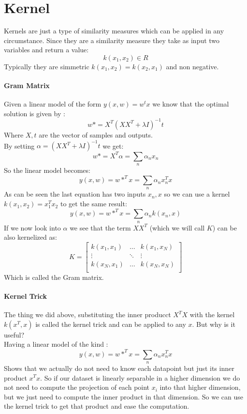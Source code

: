 \section{Kernel}
Kernels are just a type of similarity measures which can be applied in any circumstance. Since they are a similarity measure they take as input two variables and return a value:
$$k(x_1,x_2)\in R$$
Typically they are simmetric $k(x_1,x_2)=k(x_2,x_1)$ and non negative.

\paragraph{Gram Matrix}
Given a  linear model of the form $y(x,w)=w^tx$ we know that the optimal solution is given by :
$$w*=X^T(XX^T+\lambda I)^{-1}t$$
Where $X,t$ are the vector of samples and outputs.\\
By setting $\alpha=(XX^T+\lambda I)^{-1}t$ we get:
$$w*=X^T\alpha=\sum_n\alpha_nx_n$$
So the linear model becomes:
$$y(x,w)=w*^Tx=\sum_n\alpha_nx^T_nx$$
As can be seen the last equation has two inputs $x_n,x$ so we can use a kernel $k(x_1,x_2)=x_1^Tx_2$ to get the same result:
$$y(x,w)=w*^Tx=\sum_n\alpha_n k(x_n,x)$$
If we now look into $\alpha$ we see that the term $XX^T$ (which we will  call $K$) can be also kernelized as:
$$K=
\begin{bmatrix}
k(x_1,x_1) & \dots & k(x_1,x_N)\\
\vdots & \ddots & \vdots\\
k(x_N,x_1) & \dots & k(x_N,x_N)\\
\end{bmatrix}
$$
Which is called the Gram matrix.

\paragraph{Kernel Trick}
The thing we did above, substituting the inner producct $X^TX$ with the kernel $k(x^T,x)$ is called the kernel trick and can be applied to any $x$. But why is it useful?\\
Having a linear model of the kind :
$$y(x,w)=w*^Tx=\sum_n\alpha_nx^T_nx$$
Shows that we actually do not need to know each datapoint but just its inner product $x^Tx$. So if our dataset is linearly separable in a higher dimension we do not need to compute the projection of each point $x_i$ into that higher dimension, but we just need to compute the inner product in that dimension. So we can use the kernel trick to get that product and ease the computation.